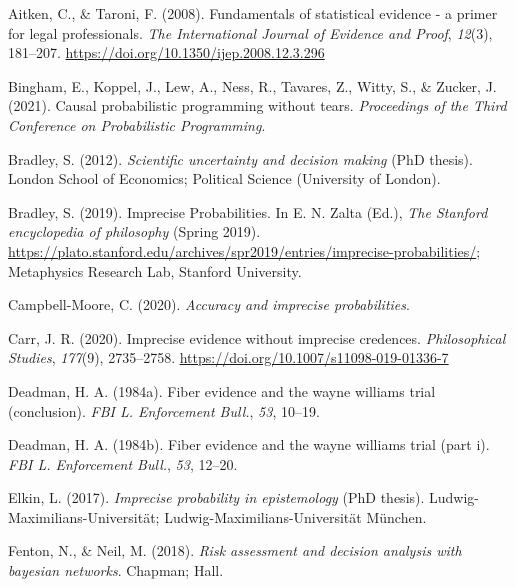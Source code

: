 \documentclass[
  10pt,
  dvipsnames,enabledeprecatedfontcommands]{scrartcl}
\newlength{\cslhangindent}
\newenvironment{CSLReferences}[2] %
 {\begin{list}{}{%
  \setlength{\itemindent}{0pt}
  \setlength{\leftmargin}{0pt}
  \setlength{\parsep}{0pt}
  \ifodd #1
   \setlength{\leftmargin}{\cslhangindent}
   \setlength{\itemindent}{-1\cslhangindent}
  \fi
  \setlength{\itemsep}{#2\baselineskip}}}
 {\end{list}}
\begin{document}
\label{refs}
\begin{CSLReferences}{1}{0}
Aitken, C., \& Taroni, F. (2008). Fundamentals of statistical evidence -
a primer for legal professionals. \emph{The International Journal of
Evidence and Proof}, \emph{12}(3), 181--207.
\url{https://doi.org/10.1350/ijep.2008.12.3.296}

Bingham, E., Koppel, J., Lew, A., Ness, R., Tavares, Z., Witty, S., \&
Zucker, J. (2021). Causal probabilistic programming without tears.
\emph{Proceedings of the Third Conference on Probabilistic Programming}.

Bradley, S. (2012). \emph{Scientific uncertainty and decision making}
(PhD thesis). London School of Economics; Political Science (University
of London).

Bradley, S. (2019). {Imprecise Probabilities}. In E. N. Zalta (Ed.),
\emph{The {Stanford} encyclopedia of philosophy} ({S}pring 2019).
\url{https://plato.stanford.edu/archives/spr2019/entries/imprecise-probabilities/};
Metaphysics Research Lab, Stanford University.

Campbell-Moore, C. (2020). \emph{Accuracy and imprecise probabilities}.

Carr, J. R. (2020). Imprecise evidence without imprecise credences.
\emph{Philosophical Studies}, \emph{177}(9), 2735--2758.
\url{https://doi.org/10.1007/s11098-019-01336-7}

Deadman, H. A. (1984a). Fiber evidence and the wayne williams trial
(conclusion). \emph{FBI L. Enforcement Bull.}, \emph{53}, 10--19.

Deadman, H. A. (1984b). Fiber evidence and the wayne williams trial
(part i). \emph{FBI L. Enforcement Bull.}, \emph{53}, 12--20.

Elkin, L. (2017). \emph{Imprecise probability in epistemology} (PhD
thesis). Ludwig-Maximilians-Universit{ä}t;
Ludwig-Maximilians-Universität München.

Fenton, N., \& Neil, M. (2018). \emph{Risk assessment and decision
analysis with bayesian networks}. Chapman; Hall.


\end{CSLReferences}
\end{document}
